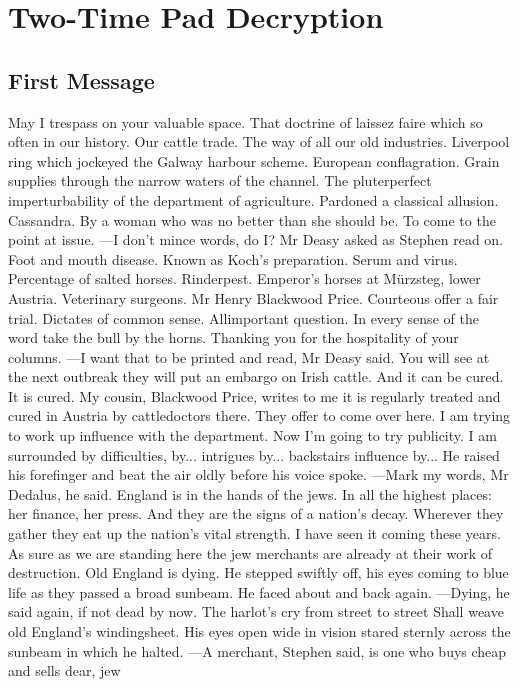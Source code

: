 \documentclass{article}
\begin{document}
\appendix
\section{Two-Time Pad Decryption}
\subsection{First Message}
May I trespass on your valuable space. That doctrine of laissez faire
which so often in our history. Our cattle trade. The way of all our old
industries. Liverpool ring which jockeyed the Galway harbour scheme.
European conflagration. Grain supplies through the narrow waters of
the channel. The pluterperfect imperturbability of the department of
agriculture. Pardoned a classical allusion. Cassandra. By a woman who
was no better than she should be. To come to the point at issue.
—I don’t mince words, do I? Mr Deasy asked as Stephen read on.
Foot and mouth disease. Known as Koch’s preparation. Serum and
virus. Percentage of salted horses. Rinderpest. Emperor’s horses at
Mürzsteg, lower Austria. Veterinary surgeons. Mr Henry Blackwood Price.
Courteous offer a fair trial. Dictates of common sense. Allimportant
question. In every sense of the word take the bull by the horns.
Thanking you for the hospitality of your columns.
—I want that to be printed and read, Mr Deasy said. You will see at
the next outbreak they will put an embargo on Irish cattle. And it can
be cured. It is cured. My cousin, Blackwood Price, writes to me it is
regularly treated and cured in Austria by cattledoctors there. They
offer to come over here. I am trying to work up influence with the
department. Now I’m going to try publicity. I am surrounded by
difficulties, by... intrigues by... backstairs influence by...
He raised his forefinger and beat the air oldly before his voice spoke.
—Mark my words, Mr Dedalus, he said. England is in the hands of the
jews. In all the highest places: her finance, her press. And they are
the signs of a nation’s decay. Wherever they gather they eat up the
nation’s vital strength. I have seen it coming these years. As sure
as we are standing here the jew merchants are already at their work of
destruction. Old England is dying.
He stepped swiftly off, his eyes coming to blue life as they passed a
broad sunbeam. He faced about and back again.
—Dying, he said again, if not dead by now.
     The harlot’s cry from street to street
     Shall weave old England’s windingsheet.
His eyes open wide in vision stared sternly across the sunbeam in which
he halted.
—A merchant, Stephen said, is one who buys cheap and sells dear, jew
\end{document}
